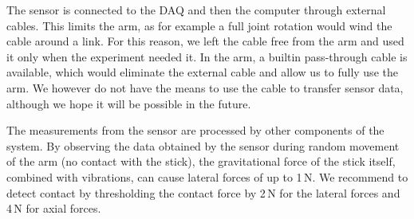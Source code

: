 \documentclass[buriama8_dp.tex]{subfiles}
\begin{document}
The sensor is connected to the DAQ and then the computer through external cables. This limits the arm, as for example a full joint rotation would wind the cable around a link. For this reason, we left the cable free from the arm and used it only when the experiment needed it. In the arm, a builtin pass-through cable is available, which would eliminate the external cable and allow us to fully use the arm. We however do not have the means to use the cable to transfer sensor data, although we hope it will be possible in the future.

The measurements from the sensor are processed by other components of the system. By observing the data obtained by the sensor during random movement of the arm (no contact with the stick), the gravitational force of the stick itself, combined with vibrations, can cause lateral forces of up to 1\,N. We recommend to detect contact by thresholding the contact force by 2\,N for the lateral forces and 4\,N for axial forces.
\end{document}
